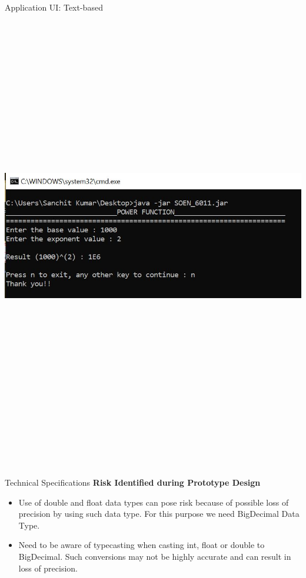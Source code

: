 \documentclass[final,hyperref={pdfpagelabels=false}]{beamer}
\begin{document}
\begin{frame}{}
\begin{columns}[t]
\begin{column}{.48\linewidth}
\begin{block}{\Large Application UI: Text-based}
					\hspace{1cm} \includegraphics[width=35cm, height=20cm]{UI.JPG}
				\end{block}
			\end{column}
			
		\end{columns}

		
		\begin{block}{\Large Technical Specifications}
			\textbf{\large Risk Identified during Prototype Design} \\ \vspace{0.5cm}
			\begin{itemize}
				\item Use of double and float data types can pose risk because of possible loss of precision by using such data type. For this purpose we need BigDecimal Data Type.
				\item Need to be aware of typecasting when casting int, float or double to BigDecimal. Such conversions may not be highly accurate and can result in loss of precision.
			\end{itemize}


\end{block}
\end{frame}
\end{document}

